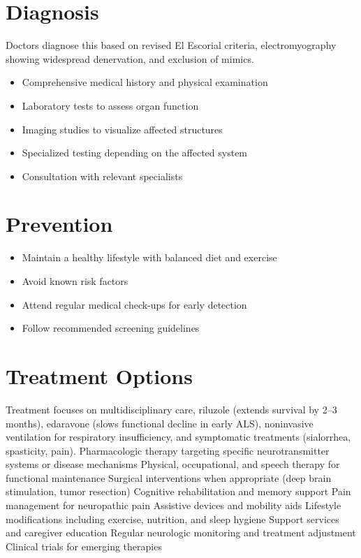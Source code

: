 \section{Diagnosis}
Doctors diagnose this based on revised El Escorial criteria, electromyography showing widespread denervation, and exclusion of mimics.

\begin{itemize}[noitemsep]
  \item Comprehensive medical history and physical examination
  \item Laboratory tests to assess organ function
  \item Imaging studies to visualize affected structures
  \item Specialized testing depending on the affected system
  \item Consultation with relevant specialists
\end{itemize}
\section{Prevention}
\begin{itemize}[noitemsep]
  \item Maintain a healthy lifestyle with balanced diet and exercise
  \item Avoid known risk factors
  \item Attend regular medical check-ups for early detection
  \item Follow recommended screening guidelines
\end{itemize}
\section{Treatment Options}
Treatment focuses on multidisciplinary care, riluzole (extends survival by 2--3 months), edaravone (slows functional decline in early ALS), noninvasive ventilation for respiratory insufficiency, and symptomatic treatments (sialorrhea, spasticity, pain). Pharmacologic therapy targeting specific neurotransmitter systems or disease mechanisms Physical, occupational, and speech therapy for functional maintenance Surgical interventions when appropriate (deep brain stimulation, tumor resection) Cognitive rehabilitation and memory support Pain management for neuropathic pain Assistive devices and mobility aids Lifestyle modifications including exercise, nutrition, and sleep hygiene Support services and caregiver education Regular neurologic monitoring and treatment adjustment Clinical trials for emerging therapies

